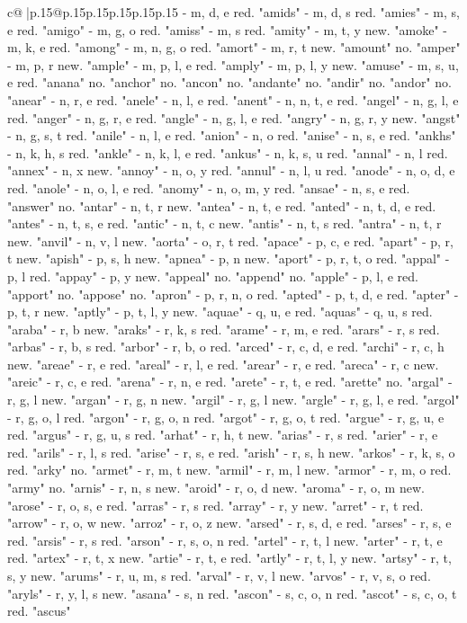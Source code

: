 \documentclass{article}
\begin{document}
{\begin{supertabular}{c@{$\;$}|p{.15\linewidth}@{}p{.15\linewidth}p{.15\linewidth}p{.15\linewidth}p{.15\linewidth}p{.15\linewidth}}
{{{{-} m, d, e red. "amids" {-} m, d, s red. "amies" {-} m, s, e red. "amigo" {-} m, g, o red. "amiss" {-} m, s red. "amity" {-} m, t, y new. "amoke" {-} m, k, e red. "among" {-} m, n, g, o red. "amort" {-} m, r, t new. "amount" no. "amper" {-} m, p, r new. "ample" {-} m, p, l, e red. "amply" {-} m, p, l, y new. "amuse" {-} m, s, u, e red. "anana" no. "anchor" no. "ancon" no. "andante" no. "andir" no. "andor" no. "anear" {-} n, r, e red. "anele" {-} n, l, e red. "anent" {-} n, n, t, e red. "angel" {-} n, g, l, e red. "anger" {-} n, g, r, e red. "angle" {-} n, g, l, e red. "angry" {-} n, g, r, y new. "angst" {-} n, g, s, t red. "anile" {-} n, l, e red. "anion" {-} n, o red. "anise" {-} n, s, e red. "ankhs" {-} n, k, h, s red. "ankle" {-} n, k, l, e red. "ankus" {-} n, k, s, u red. "annal" {-} n, l red. "annex" {-} n, x new. "annoy" {-} n, o, y red. "annul" {-} n, l, u red. "anode" {-} n, o, d, e red. "anole" {-} n, o, l, e red. "anomy" {-} n, o, m, y red. "ansae" {-} n, s, e red. "answer" no. "antar" {-} n, t, r new. "antea" {-} n, t, e red. "anted" {-} n, t, d, e red. "antes" {-} n, t, s, e red. "antic" {-} n, t, c new. "antis" {-} n, t, s red. "antra" {-} n, t, r new. "anvil" {-} n, v, l new. "aorta" {-} o, r, t red. "apace" {-} p, c, e red. "apart" {-} p, r, t new. "apish" {-} p, s, h new. "apnea" {-} p, n new. "aport" {-} p, r, t, o red. "appal" {-} p, l red. "appay" {-} p, y new. "appeal" no. "append" no. "apple" {-} p, l, e red. "apport" no. "appose" no. "apron" {-} p, r, n, o red. "apted" {-} p, t, d, e red. "apter" {-} p, t, r new. "aptly" {-} p, t, l, y new. "aquae" {-} q, u, e red. "aquas" {-} q, u, s red. "araba" {-} r, b new. "araks" {-} r, k, s red. "arame" {-} r, m, e red. "arars" {-} r, s red. "arbas" {-} r, b, s red. "arbor" {-} r, b, o red. "arced" {-} r, c, d, e red. "archi" {-} r, c, h new. "areae" {-} r, e red. "areal" {-} r, l, e red. "arear" {-} r, e red. "areca" {-} r, c new. "areic" {-} r, c, e red. "arena" {-} r, n, e red. "arete" {-} r, t, e red. "arette" no. "argal" {-} r, g, l new. "argan" {-} r, g, n new. "argil" {-} r, g, l new. "argle" {-} r, g, l, e red. "argol" {-} r, g, o, l red. "argon" {-} r, g, o, n red. "argot" {-} r, g, o, t red. "argue" {-} r, g, u, e red. "argus" {-} r, g, u, s red. "arhat" {-} r, h, t new. "arias" {-} r, s red. "arier" {-} r, e red. "arils" {-} r, l, s red. "arise" {-} r, s, e red. "arish" {-} r, s, h new. "arkos" {-} r, k, s, o red. "arky" no. "armet" {-} r, m, t new. "armil" {-} r, m, l new. "armor" {-} r, m, o red. "army" no. "arnis" {-} r, n, s new. "aroid" {-} r, o, d new. "aroma" {-} r, o, m new. "arose" {-} r, o, s, e red. "arras" {-} r, s red. "array" {-} r, y new. "arret" {-} r, t red. "arrow" {-} r, o, w new. "arroz" {-} r, o, z new. "arsed" {-} r, s, d, e red. "arses" {-} r, s, e red. "arsis" {-} r, s red. "arson" {-} r, s, o, n red. "artel" {-} r, t, l new. "arter" {-} r, t, e red. "artex" {-} r, t, x new. "artie" {-} r, t, e red. "artly" {-} r, t, l, y new. "artsy" {-} r, t, s, y new. "arums" {-} r, u, m, s red. "arval" {-} r, v, l new. "arvos" {-} r, v, s, o red. "aryls" {-} r, y, l, s new. "asana" {-} s, n red. "ascon" {-} s, c, o, n red. "ascot" {-} s, c, o, t red. "ascus" }}}
\end{supertabular}}
\end{document}
